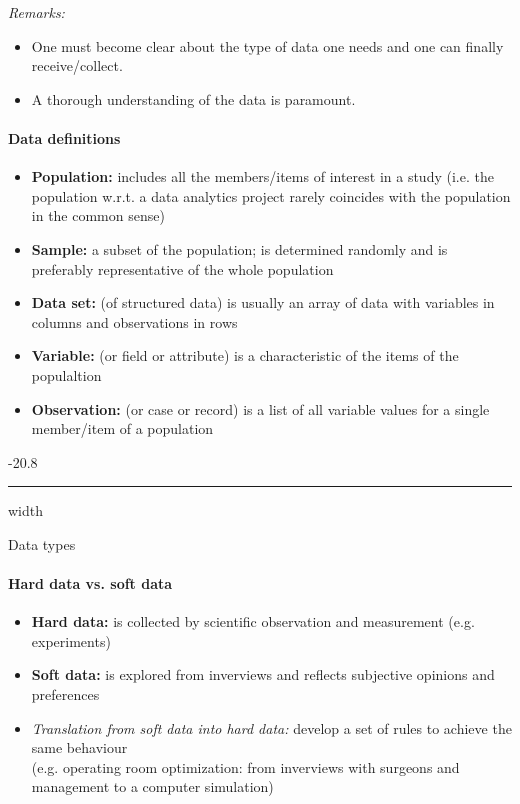 \documentclass[a4paper, landscape, 6pt, fleqn]{scrartcl}
\makeatletter
\renewcommand{\emph}[1]{\textbf{#1}}
\renewcommand{\subsubsection}{\@startsection{subsubsection}{1}{0mm}%
{-2\baselineskip}{0.8\baselineskip}%
{\hrule depth 0.2pt width\columnwidth\vspace*{1.2em}\normalsize\bfseries}}
\makeatother
\begin{document}
\begin{multicols*}{4}
\textit{Remarks:}
\begin{itemize}
\item One must become clear about the type of data one needs and one can finally receive/collect.
\item A thorough understanding of the data is paramount.
\end{itemize}

\paragraph{Data definitions}

\begin{itemize}
\item \emph{Population:} includes all the members/items of interest in a study (i.e. the population w.r.t. a data analytics project rarely coincides with the population in the common sense)
\item \emph{Sample:} a subset of the population; is determined randomly and is preferably representative of the whole population
\item \emph{Data set:} (of structured data) is usually an array of data with variables in columns and observations in rows
\item \emph{Variable:} (or field or attribute) is a characteristic of the items of the populaltion
\item \emph{Observation:} (or case or record) is a list of all variable values for a single member/item of a population
\end{itemize}

\subsubsection{Data types}

\paragraph{Hard data vs. soft data}

\begin{itemize}
\item \emph{Hard data:} is collected by scientific observation and measurement (e.g. experiments)
\item \emph{Soft data:}  is explored from inverviews and reflects subjective opinions and preferences
\item \textit{Translation from soft data into hard data:} develop a set of rules to achieve the same behaviour \\
(e.g. operating room optimization: from inverviews with surgeons and management to a computer simulation)
\end{itemize}


\end{multicols*}
\end{document}
